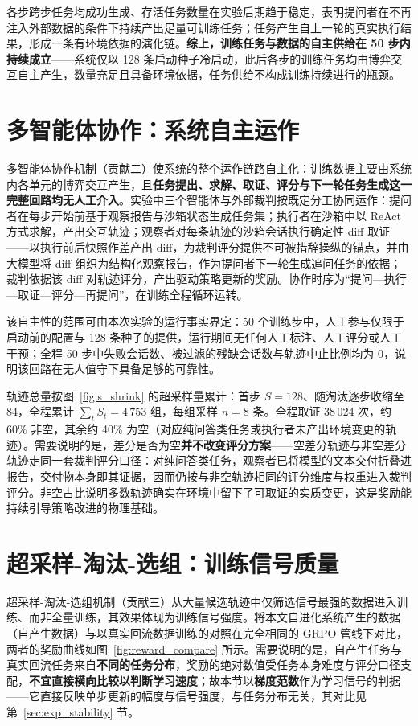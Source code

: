 各步跨步任务均成功生成、存活任务数量在实验后期趋于稳定，表明提问者在不再注入外部数据的条件下持续产出足量可训练任务；任务产生自上一轮的真实执行结果，形成一条有环境依据的演化链。\textbf{综上，训练任务与数据的自主供给在 50 步内持续成立}——系统仅以 128 条启动种子冷启动，此后各步的训练任务均由博弈交互自主产生，数量充足且具备环境依据，任务供给不构成训练持续进行的瓶颈。

\section{多智能体协作：系统自主运作}
\label{sec:exp_multiagent}

多智能体协作机制（贡献二）使系统的整个运作链路自主化：训练数据主要由系统内各单元的博弈交互产生，且\textbf{任务提出、求解、取证、评分与下一轮任务生成这一完整回路均无人工介入}。实验中三个智能体与外部裁判按既定分工协同运作：提问者在每步开始前基于观察报告与沙箱状态生成任务集；执行者在沙箱中以 ReAct 方式求解，产出交互轨迹；观察者对每条轨迹的沙箱会话执行确定性 diff 取证——以执行前后快照作差产出 diff，为裁判评分提供不可被措辞操纵的锚点，并由大模型将 diff 组织为结构化观察报告，作为提问者下一轮生成追问任务的依据；裁判依据该 diff 对轨迹评分，产出驱动策略更新的奖励。协作时序为“提问—执行—取证—评分—再提问”，在训练全程循环运转。

该自主性的范围可由本次实验的运行事实界定：50 个训练步中，人工参与仅限于启动前的配置与 128 条种子的提供，运行期间无任何人工标注、人工评分或人工干预；全程 50 步中失败会话数、被过滤的残缺会话数与轨迹中止比例均为 0，说明该回路在无人值守下具备足够的可靠性。

轨迹总量按图~\ref{fig:s_shrink} 的超采样量累计：首步 $S=128$、随淘汰逐步收缩至 84，全程累计 $\sum_t S_t = 4\,753$ 组，每组采样 $n=8$ 条。全程取证 38\,024 次，约 60\% 非空，其余约 40\% 为空（对应纯问答类任务或执行者未产出环境变更的轨迹）。需要说明的是，差分是否为空\textbf{并不改变评分方案}——空差分轨迹与非空差分轨迹走同一套裁判评分口径：对纯问答类任务，观察者已将模型的文本交付折叠进报告，交付物本身即其证据，因而仍按与非空轨迹相同的评分维度与权重进入裁判评分。非空占比说明多数轨迹确实在环境中留下了可取证的实质变更，这是奖励能持续引导策略改进的物理基础。

\section{超采样-淘汰-选组：训练信号质量}
\label{sec:exp_oversample}

超采样-淘汰-选组机制（贡献三）从大量候选轨迹中仅筛选信号最强的数据进入训练、而非全量训练，其效果体现为训练信号强度。将本文自进化系统产生的数据（自产生数据）与以真实回流数据训练的对照在完全相同的 GRPO 管线下对比，两者的奖励曲线如图~\ref{fig:reward_compare} 所示。需要说明的是，自产生任务与真实回流任务来自\textbf{不同的任务分布}，奖励的绝对数值受任务本身难度与评分口径支配，\textbf{不宜直接横向比较以判断学习速度}；故本节以\textbf{梯度范数}作为学习信号的判据——它直接反映单步更新的幅度与信号强度，与任务分布无关，其对比见第~\ref{sec:exp_stability} 节。

